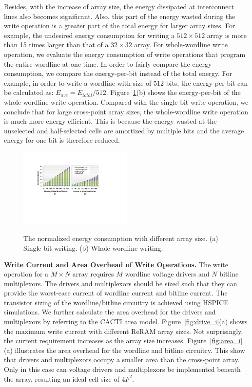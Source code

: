 Besides, with the increase of array size, the energy dissipated at
interconnect lines also becomes significant. Also, this part of the energy
wasted during the write operation is a greater part of the total energy
for larger array sizes. For example, the undesired energy consumption for
writing a $512{\times}512$ array is more than 15 times larger than that of
a $32{\times}32$ array. For whole-wordline write operation, we evaluate
the energy consumption of write operations that program the entire
wordline at one time. In order to fairly compare the energy consumption,
we compare the energy-per-bit instead of the total energy. For example, in
order to write a wordline with size of 512 bits, the energy-per-bit can be
calculated as: $E_{ave}=E_{total}/512$. Figure~\ref{fig:energy}(b) shows
the energy-per-bit of the whole-wordline write operation. Compared with
the single-bit write operation, we conclude that for large cross-point
array sizes, the whole-wordline write operation is much more energy
efficient. This is because the energy wasted at the unselected and
half-selected cells are amortized by multiple bits and the average energy
for one bit is therefore reduced.

\begin{figure}%
\centering
  \includegraphics[width=0.5\textwidth]{./figures/energy_f_tall2.pdf}\\
  \caption{The normalized energy consumption with different array size. (a) Single-bit writing. (b) Whole-wordline writing.}\label{fig:energy}
    \vspace{-5pt}
\end{figure}

\vspace{5pt}\noindent\textbf{Write Current and Area Overhead of Write Operations.}
%
The write operation for a $M \times N$ array requires $M$ wordline voltage
drivers and $N$ bitline multiplexors. The drivers and multiplexors should
be sized such that they can provide the worst-case current of wordline
current and bitline current. The transistor sizing of the wordline/bitline
circuitry is achieved using HSPICE simulations. We further calculate the
area overhead for the drivers and multiplexors by referring to the CACTI
area model. Figure~\ref{fig:drive_i}(a) shows the maximum write current
with different ReRAM array sizes. Not surprisingly, the current
requirement increases as the array size increases.
Figure~\ref{fig:area_i}(a) illustrates the area overhead for the wordline
and bitline circuitry. This show that drivers and multiplexors occupy a
smaller area than the cross-point array. Only in this case can voltage
drivers and multiplexors be implemented beneath the array, resulting an
ideal cell size of $4F^2$.

